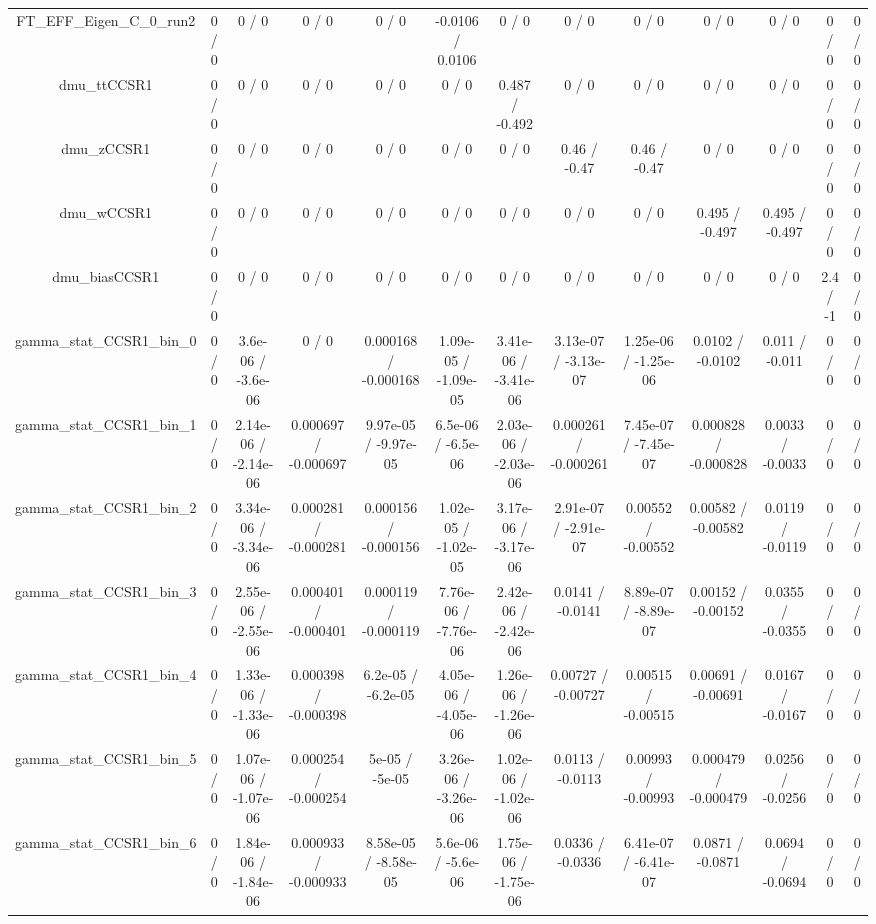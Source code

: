 \documentclass[10pt]{article}
\begin{document}
\begin{table}[htbp]
\begin{center}
\begin{tabular}{|c|c|c|c|c|c|c|c|c|c|c|c|c|}
  FT_EFF_Eigen_C_0_run2 & 0 / 0 & 0 / 0 & 0 / 0 & 0 / 0 & -0.0106 / 0.0106 & 0 / 0 & 0 / 0 & 0 / 0 & 0 / 0 & 0 / 0 & 0 / 0 & 0 / 0 \\ 
  dmu_ttCCSR1 & 0 / 0 & 0 / 0 & 0 / 0 & 0 / 0 & 0 / 0 & 0.487 / -0.492 & 0 / 0 & 0 / 0 & 0 / 0 & 0 / 0 & 0 / 0 & 0 / 0 \\ 
  dmu_zCCSR1 & 0 / 0 & 0 / 0 & 0 / 0 & 0 / 0 & 0 / 0 & 0 / 0 & 0.46 / -0.47 & 0.46 / -0.47 & 0 / 0 & 0 / 0 & 0 / 0 & 0 / 0 \\ 
  dmu_wCCSR1 & 0 / 0 & 0 / 0 & 0 / 0 & 0 / 0 & 0 / 0 & 0 / 0 & 0 / 0 & 0 / 0 & 0.495 / -0.497 & 0.495 / -0.497 & 0 / 0 & 0 / 0 \\ 
  dmu_biasCCSR1 & 0 / 0 & 0 / 0 & 0 / 0 & 0 / 0 & 0 / 0 & 0 / 0 & 0 / 0 & 0 / 0 & 0 / 0 & 0 / 0 & 2.4 / -1 & 0 / 0 \\ 
  gamma_stat_CCSR1_bin_0 & 0 / 0 & 3.6e-06 / -3.6e-06 & 0 / 0 & 0.000168 / -0.000168 & 1.09e-05 / -1.09e-05 & 3.41e-06 / -3.41e-06 & 3.13e-07 / -3.13e-07 & 1.25e-06 / -1.25e-06 & 0.0102 / -0.0102 & 0.011 / -0.011 & 0 / 0 & 0 / 0 \\ 
  gamma_stat_CCSR1_bin_1 & 0 / 0 & 2.14e-06 / -2.14e-06 & 0.000697 / -0.000697 & 9.97e-05 / -9.97e-05 & 6.5e-06 / -6.5e-06 & 2.03e-06 / -2.03e-06 & 0.000261 / -0.000261 & 7.45e-07 / -7.45e-07 & 0.000828 / -0.000828 & 0.0033 / -0.0033 & 0 / 0 & 0 / 0 \\ 
  gamma_stat_CCSR1_bin_2 & 0 / 0 & 3.34e-06 / -3.34e-06 & 0.000281 / -0.000281 & 0.000156 / -0.000156 & 1.02e-05 / -1.02e-05 & 3.17e-06 / -3.17e-06 & 2.91e-07 / -2.91e-07 & 0.00552 / -0.00552 & 0.00582 / -0.00582 & 0.0119 / -0.0119 & 0 / 0 & 0 / 0 \\ 
  gamma_stat_CCSR1_bin_3 & 0 / 0 & 2.55e-06 / -2.55e-06 & 0.000401 / -0.000401 & 0.000119 / -0.000119 & 7.76e-06 / -7.76e-06 & 2.42e-06 / -2.42e-06 & 0.0141 / -0.0141 & 8.89e-07 / -8.89e-07 & 0.00152 / -0.00152 & 0.0355 / -0.0355 & 0 / 0 & 0 / 0 \\ 
  gamma_stat_CCSR1_bin_4 & 0 / 0 & 1.33e-06 / -1.33e-06 & 0.000398 / -0.000398 & 6.2e-05 / -6.2e-05 & 4.05e-06 / -4.05e-06 & 1.26e-06 / -1.26e-06 & 0.00727 / -0.00727 & 0.00515 / -0.00515 & 0.00691 / -0.00691 & 0.0167 / -0.0167 & 0 / 0 & 0 / 0 \\ 
  gamma_stat_CCSR1_bin_5 & 0 / 0 & 1.07e-06 / -1.07e-06 & 0.000254 / -0.000254 & 5e-05 / -5e-05 & 3.26e-06 / -3.26e-06 & 1.02e-06 / -1.02e-06 & 0.0113 / -0.0113 & 0.00993 / -0.00993 & 0.000479 / -0.000479 & 0.0256 / -0.0256 & 0 / 0 & 0 / 0 \\ 
  gamma_stat_CCSR1_bin_6 & 0 / 0 & 1.84e-06 / -1.84e-06 & 0.000933 / -0.000933 & 8.58e-05 / -8.58e-05 & 5.6e-06 / -5.6e-06 & 1.75e-06 / -1.75e-06 & 0.0336 / -0.0336 & 6.41e-07 / -6.41e-07 & 0.0871 / -0.0871 & 0.0694 / -0.0694 & 0 / 0 & 0 / 0 \\ 

\end{tabular}
\end{center}
\end{table}
\end{document}
